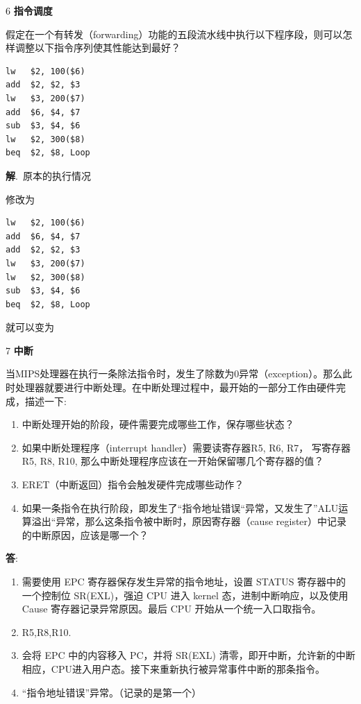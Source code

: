 \documentclass[12pt,a4paper]{article}
\newenvironment{problems}{\begin{list}{}{\renewcommand{\makelabel}[1]{\textbf{##1}.\hfil}}}{\end{list}}
\providecommand{\ans}{\textbf{答}:~}
\providecommand{\sol}{\textbf{解}.~}
\begin{document}
\begin{problems}
    \item[6] \textbf{指令调度}

    假定在一个有转发（forwarding）功能的五段流水线中执行以下程序段，则可以怎样调整以下指令序列使其性能达到最好？
    \begin{verbatim}
lw   $2, 100($6)
add  $2, $2, $3
lw   $3, 200($7)
add  $6, $4, $7
sub  $3, $4, $6
lw   $2, 300($8)
beq  $2, $8, Loop
    \end{verbatim}

    \sol 原本的执行情况
    
    

    修改为

    \begin{verbatim}
lw   $2, 100($6)
add  $6, $4, $7
add  $2, $2, $3
lw   $3, 200($7)
lw   $2, 300($8)
sub  $3, $4, $6
beq  $2, $8, Loop
    \end{verbatim}

    就可以变为

    

    \item[7] \textbf{中断}
 
当MIPS处理器在执行一条除法指令时，发生了除数为0异常（exception）。那么此时处理器就要进行中断处理。在中断处理过程中，最开始的一部分工作由硬件完成，描述一下: 
\begin{enumerate}
    \item 中断处理开始的阶段，硬件需要完成哪些工作，保存哪些状态？ 
    \item 如果中断处理程序（interrupt handler）需要读寄存器R5, R6, R7， 写寄存器R5, R8, R10, 那么中断处理程序应该在一开始保留哪几个寄存器的值？
    \item ERET（中断返回）指令会触发硬件完成哪些动作？
    \item 如果一条指令在执行阶段，即发生了“指令地址错误“异常，又发生了”ALU运算溢出“异常，那么这条指令被中断时，原因寄存器（cause register）中记录的中断原因，应该是哪一个？
\end{enumerate}
    
\ans \begin{enumerate}
    \item 需要使用 EPC 寄存器保存发生异常的指令地址，设置 STATUS 寄存器中的一个控制位 SR(EXL)，强迫 CPU 进入 kernel 态，进制中断响应，以及使用 Cause 寄存器记录异常原因。最后 CPU 开始从一个统一入口取指令。
    \item R5,R8,R10.
    \item 会将 EPC 中的内容移入 PC，并将 SR(EXL) 清零，即开中断，允许新的中断相应，CPU进入用户态。接下来重新执行被异常事件中断的那条指令。
    \item “指令地址错误”异常。（记录的是第一个）
\end{enumerate}

\end{problems}
\end{document}
